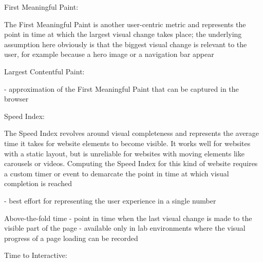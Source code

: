 First Meaningful Paint: %

The First Meaningful Paint is another user-centric metric and represents the point in time at which the largest visual change takes place; the underlying assumption here obviously is that the biggest visual change is relevant to the user, for example because a hero image or a navigation bar appear





Largest Contentful Paint: %

- approximation of the First Meaningful Paint that can be captured in the browser






Speed Index: %

The Speed Index revolves around visual completeness and represents the average time it takes for website elements to become visible. It works well for websites with a static layout, but is unreliable for websites with moving elements like carousels or videos. Computing the Speed Index for this kind of website requires a custom timer or event to demarcate the point in time at which visual completion is reached

- best effort for representing the user experience in a single number



Above-the-fold time %
- point in time when the last visual change is made to the visible part of the page
- available only in lab environments where the visual progress of a page loading can be recorded





Time to Interactive: %












